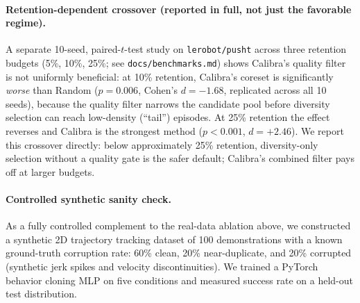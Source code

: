 \documentclass[10pt,twocolumn]{article}
\begin{document}
\paragraph{Retention-dependent crossover (reported in full, not just the
favorable regime).} A separate 10-seed, paired-$t$-test study on
\texttt{lerobot/pusht} across three retention budgets (5\%, 10\%, 25\%; see
\texttt{docs/benchmarks.md}) shows Calibra's quality filter is not uniformly
beneficial: at 10\% retention, Calibra's coreset is significantly
\emph{worse} than Random ($p=0.006$, Cohen's $d=-1.68$, replicated across all
10 seeds), because the quality filter narrows the candidate pool before
diversity selection can reach low-density (``tail'') episodes. At 25\%
retention the effect reverses and Calibra is the strongest method
($p<0.001$, $d=+2.46$). We report this crossover directly: below
approximately 25\% retention, diversity-only selection without a quality
gate is the safer default; Calibra's combined filter pays off at larger
budgets.

\paragraph{Controlled synthetic sanity check.}
As a fully controlled complement to the real-data ablation above, we
constructed a synthetic 2D trajectory tracking dataset of 100 demonstrations
with a known ground-truth corruption rate: 60\% clean, 20\% near-duplicate,
and 20\% corrupted (synthetic jerk spikes and velocity discontinuities). We
trained a PyTorch behavior cloning MLP on five conditions and measured
success rate on a held-out test distribution.

\begin{table}[h]
\centering
\caption{Coreset pruning on a synthetic 2D imitation task with a known,
injected 20\% corruption rate.}
\label{tab:coreset}
\small
{}
\end{table}
\end{document}
